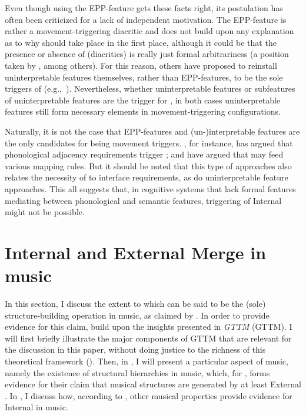 \documentclass[output=paper]{langsci/langscibook}
\begin{document}
Even though using the \gls{EPP}-feature gets
these facts right, its postulation has often been criticized for a lack of
independent motivation. The \gls{EPP}-feature is rather a movement-triggering diacritic and does not build upon any
explanation as to why  should take place in the first place,
although it could be that the presence or absence of 
(diacritics) is really just formal arbitrariness (a position taken by
\citealt{BibHolRob2009,BibHolRobShee2014,BibRob2015}, among others).  For this
reason, others have proposed to reinstall uninterpretable features themselves,
rather than \gls{EPP}-features, to be the
sole triggers of  (e.g.,~\citealt{BjoZei2019}). Nevertheless,
whether uninterpretable features or subfeatures of uninterpretable features are
the trigger for , in both cases uninterpretable features still
form necessary elements in movement-triggering configurations.

Naturally, it is not the case that \gls{EPP}-features and (un-)interpretable features are the only candidates for being
movement triggers. \citet{Richards2016}, for instance, has argued that
phonological adjacency requirements trigger ; and \citet{NeeKoo2008}
have argued that  may feed various mapping rules. But it should be
noted that this type of approaches also relates the necessity of  to
interface requirements, as do uninterpretable feature approaches. This all
suggests that, in cognitive systems that lack formal features mediating between
phonological and semantic features, triggering of Internal  might
not be possible.

\section{Internal and External Merge in music}\label{sec:key:26.3}

In this section, I discuss the extent to which  can be said to be
the (sole) structure-building operation in music, as claimed by
\citeauthor{KatzPes2011}.  In order to provide evidence for this claim,
\citeauthor{KatzPes2011} build upon the insights presented in
 \emph{\glsdesc{GTTM}} (\gls{GTTM}). I will
first briefly illustrate the major components of \gls{GTTM} that are relevant for the discussion in this paper,
without doing justice to the richness of this theoretical framework
(). Then, in , I will present a
particular aspect of music, namely the existence of structural hierarchies in
music, which, for \citeauthor{KatzPes2011}, forms evidence for their claim that
musical structures are generated by at least External .  In
, I discuss how, according to \citeauthor{KatzPes2011},
other musical properties provide evidence for Internal  in music.
\end{document}
